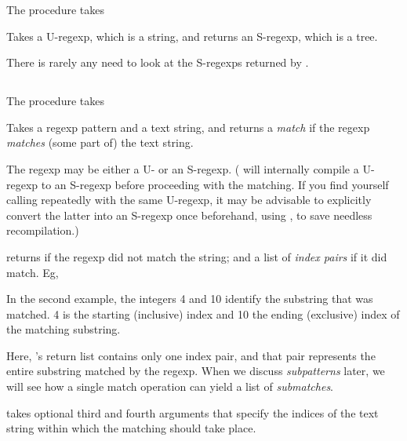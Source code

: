 {\ifx\MzLibManual\Undefined
The procedure  takes
\else
{}

Takes
\fi
a U-regexp, which is a string, and returns
an S-regexp, which is a tree.


\n There is rarely any need to look at the S-regexps
returned by .

\subsection{}

\ifx\MzLibManual\Undefined
The procedure  takes
\else
{}

Takes
\fi
a
regexp pattern and a text string, and returns a {\em
match} if the regexp {\em matches} (some part of) the text string.

The regexp may be either a U- or an S-regexp.
( will internally compile a
U-regexp to an S-regexp before proceeding with the
matching.  If you find yourself calling
 repeatedly with the same
U-regexp, it may be advisable to explicitly convert the
latter into an S-regexp once beforehand, using
, to save needless recompilation.)

 returns  if the regexp did not
match the string; and a list of {\em index pairs} if it
did match.  Eg,


\n In the second example, the integers 4 and 10 identify
the substring that was matched. 4 is the starting
(inclusive) index and 10 the ending (exclusive) index of
the matching substring.


Here, 's return list contains only
one index pair, and that pair represents the entire
substring matched by the regexp.  When we discuss
{\em subpatterns} later, we will see how a single match
operation can yield a list of {\em submatches}.

 takes optional third
and fourth arguments that specify the indices of
the text string within which the matching should
take place.

}
